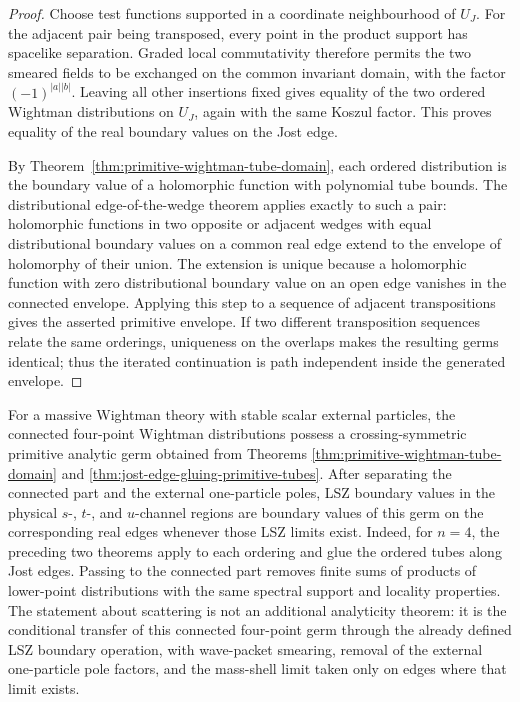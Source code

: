 \begin{proof}
Choose test functions supported in a coordinate neighbourhood of \(U_J\).
For the adjacent pair being transposed, every point in the product support
has spacelike separation.  Graded local commutativity therefore permits the
two smeared fields to be exchanged on the common invariant domain, with the
factor \((-1)^{|a||b|}\).  Leaving all other insertions fixed gives equality
of the two ordered Wightman distributions on \(U_J\), again with the same
Koszul factor.  This proves equality of the real boundary values on the Jost
edge.

By Theorem~\ref{thm:primitive-wightman-tube-domain}, each ordered
distribution is the boundary value of a holomorphic function with polynomial
tube bounds.  The distributional edge-of-the-wedge theorem applies exactly
to such a pair: holomorphic functions in two opposite or adjacent wedges with
equal distributional boundary values on a common real edge extend to the
envelope of holomorphy of their union.  The extension is unique because a
holomorphic function with zero distributional boundary value on an open edge
vanishes in the connected envelope.  Applying this step to a sequence of
adjacent transpositions gives the asserted primitive envelope.  If two
different transposition sequences relate the same orderings, uniqueness on
the overlaps makes the resulting germs identical; thus the iterated
continuation is path independent inside the generated envelope.
\end{proof}

\begin{remark}
\label{rem:primitive-domain-output-for-scattering}
For a massive Wightman theory with stable scalar external particles, the
connected four-point Wightman distributions possess a crossing-symmetric
primitive analytic germ obtained from Theorems
\ref{thm:primitive-wightman-tube-domain} and
\ref{thm:jost-edge-gluing-primitive-tubes}.  After separating the connected
part and the external one-particle poles, LSZ boundary values in the physical
\(s\)-, \(t\)-, and \(u\)-channel regions are boundary values of this germ on
the corresponding real edges whenever those LSZ limits exist.
Indeed, for \(n=4\), the preceding two theorems apply to each ordering and
glue the ordered tubes along Jost edges.  Passing to the connected part removes
finite sums of products of lower-point distributions with the same spectral
support and locality properties.  The statement about scattering is not an
additional analyticity theorem: it is the conditional transfer of this
connected four-point germ through the already defined LSZ boundary operation,
with wave-packet smearing, removal of the external one-particle pole factors,
and the mass-shell limit taken only on edges where that limit exists.
\end{remark}

